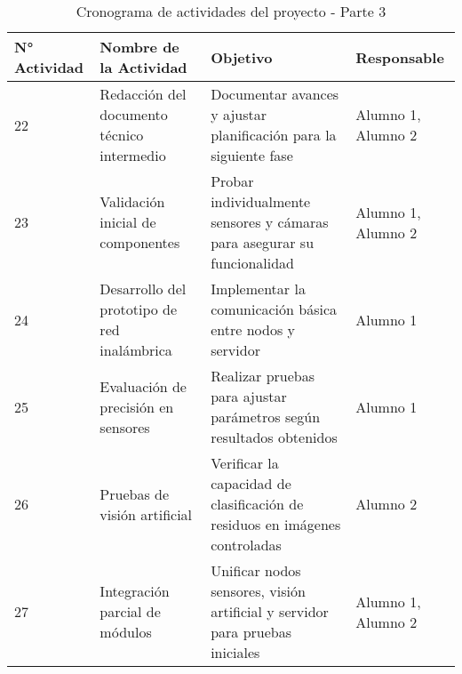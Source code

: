 \begin{table}[H]
    \centering
    \renewcommand{\arraystretch}{1.5}
    \begin{tabular}{ |p{1.5cm}|p{5cm}|p{5.5cm}|p{2.5cm}| }

        \hline
        \textbf{N° Actividad} & \textbf{Nombre de la Actividad} & \textbf{Objetivo} & \textbf{Responsable} \\
        \hline
        22 & Redacción del documento técnico intermedio & Documentar avances y ajustar planificación para la siguiente fase & Alumno 1, Alumno 2 \\\hline
        23 & Validación inicial de componentes & Probar individualmente sensores y cámaras para asegurar su funcionalidad & Alumno 1, Alumno 2 \\\hline
        24 & Desarrollo del prototipo de red inalámbrica & Implementar la comunicación básica entre nodos y servidor & Alumno 1 \\\hline
        25 & Evaluación de precisión en sensores & Realizar pruebas para ajustar parámetros según resultados obtenidos & Alumno 1 \\\hline
        26 & Pruebas de visión artificial & Verificar la capacidad de clasificación de residuos en imágenes controladas & Alumno 2 \\\hline
        27 & Integración parcial de módulos & Unificar nodos sensores, visión artificial y servidor para pruebas iniciales & Alumno 1, Alumno 2 \\\hline

    \end{tabular}
    \caption{Cronograma de actividades del proyecto - Parte 3}
    \label{tab:cronograma_proyecto_parte3}
\end{table}
